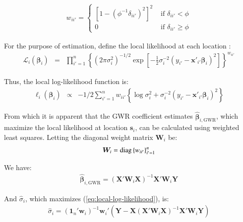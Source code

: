 \documentclass[authoryear, review, 11pt]{elsarticle}
\begin{document}
	\begin{eqnarray}
		w_{ii'} = \begin{cases} \left[1-\left(\phi^{-1}\delta_{ii'}\right)^2\right]^2 &\mbox{ if } \delta_{ii'} < \phi \\ 0 &\mbox{ if } \delta_{ii'} \geq \phi \end{cases}
	\end{eqnarray}
	
	For the purpose of estimation, define the local likelihood at each location \citep{Fotheringham:2002}:
	\begin{eqnarray}
		\mathcal{L}_i \left(\bm{\beta}_i \right) &=& \prod_{i'=1}^n \left\{ \left(2 \pi \sigma^2_i  \right)^{-1/2}  \exp\left[-\frac{1}{2} \sigma^{-2}_i  \left(y_{i'} - \bm{x}'_{i'} \bm{\beta}_i \right)^2 \right] \right\} ^ {w_{ii'}}
	\end{eqnarray}
			
	Thus, the local log-likelihood function is:
	\begin{eqnarray}\label{eq:local-log-likelihood}
		\ell_i\left(\bm{\beta}_i\right) &\propto& -1/2 \sum_{i'=1}^n w_{ii'} \left\{ \log{\sigma^2_i}  + \sigma^{-2}_i  \left(y_{i'} - \bm{x}'_{i'} \bm{\beta}_i \right)^2 \right\}
	\end{eqnarray}
	
	From which it is apparent that the GWR coefficient estimates $\hat{\bm{\beta}}_{i,\text{GWR}}$, which maximize the local likelihood at location $\bm{s}_i$, can be calculated using weighted least squares. Letting the diagonal weight matrix $\bm{W}_i$ be:
	\begin{eqnarray}
		\bm{W}_i =  {\rm diag}\left\{w_{ii'}\right\}_{i' = 1}^n
	\end{eqnarray}
	
	We have:	
	\begin{eqnarray}
		\hat{\bm{\beta}}_{i, \text{GWR}} = \left( \bm{X}'\bm{W}_i\bm{X} \right)^{-1} \bm{X}'\bm{W}_i\bm{Y}
	\end{eqnarray}
	
	And $\hat{\sigma}_i$, which maximizes (\ref{eq:local-log-likelihood}), is:
	\begin{eqnarray}
		\hat{\sigma}_i = \left(\bm{1}_n'\bm{w}_i \right)^{-1} \bm{w}_i'\left(\bm{Y}-\bm{X}\left(\bm{X}'\bm{W}_i\bm{X}\right)^{-1}\bm{X}'\bm{W}_i\bm{Y}\right)
	\end{eqnarray}
	
\end{document}
